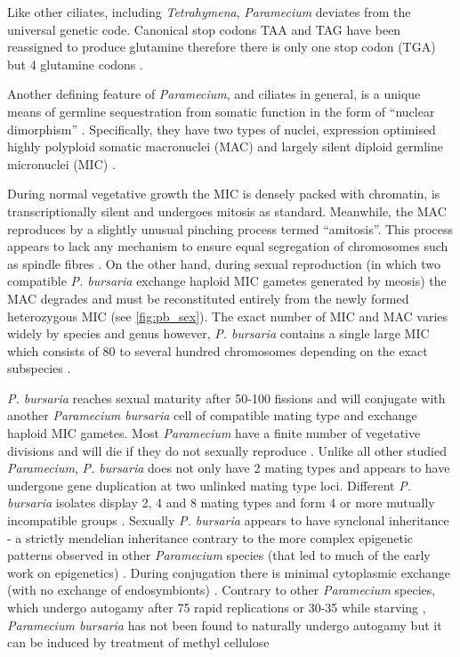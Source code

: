 Like other ciliates, including \textit{Tetrahymena}, \textit{Paramecium} deviates from the universal genetic code.
Canonical stop codons TAA and TAG have been reassigned to produce glutamine therefore there is only one stop codon (TGA) but 4 glutamine codons \citep{Salim2008}.  

Another defining feature of \textit{Paramecium}, and ciliates in general, is a unique means of germline sequestration from somatic function 
in the form of ``nuclear dimorphism'' \citep{Jahn2002}.
Specifically, they have two types of nuclei, expression optimised highly polyploid somatic macronuclei (MAC)
and largely silent diploid germline micronuclei (MIC) \citep{Prescott1994}. 

During normal vegetative growth the MIC is densely packed with chromatin, is transcriptionally silent and undergoes
mitosis as standard.  Meanwhile, the MAC reproduces by a slightly unusual pinching process termed ``amitosis''.  This process
appears to lack any mechanism to ensure equal segregation of chromosomes such as spindle fibres \citep{Kiefer2013}.
On the other hand, during sexual reproduction (in which two compatible \textit{P. bursaria} exchange haploid MIC gametes generated by meosis) the MAC 
degrades and must be reconstituted entirely from the newly formed heterozygous MIC \citep{Jahn2002} (see \ref{fig:pb_sex}).
The exact number of MIC and MAC varies widely by species and genus however, \textit{P. bursaria}
contains a single large MIC which consists of 80 to several hundred chromosomes depending on the exact subspecies \citep{Chen1940}.  

\textit{P. bursaria} reaches sexual maturity after 50-100 fissions \citep{Siegel1960} and will conjugate with another \textit{Paramecium bursaria}
cell of compatible mating type and exchange haploid MIC gametes. Most \textit{Paramecium} have a finite number of vegetative divisions and 
will die if they do not sexually reproduce \citep{Kiefer2013}. Unlike all other studied \textit{Paramecium}, 
\textit{P. bursaria} does not only have 2 mating types and appears to have undergone gene duplication at two unlinked mating type loci.  
Different \textit{P. bursaria} isolates display 2, 4 and 8 mating types \citep{Phadke2009} and form 4 or more mutually 
incompatible groups \citep{Jennings1939}. 
Sexually \textit{P. bursaria} appears to have synclonal inheritance - a strictly mendelian inheritance contrary to the more 
complex epigenetic patterns observed in other \textit{Paramecium} species (that led to much of the early work on epigenetics) \citep{Siegel1960,Phadke2009}.
During conjugation there is minimal cytoplasmic exchange (with no exchange of endosymbionts) \citep{Wichterman1946}. %
Contrary to other \textit{Paramecium} species, which undergo autogamy after 75 rapid replications \citep{Sung2012} or 30-35 while starving
\citep{Berger1986}, \textit{Paramecium bursaria} has not been found to naturally undergo autogamy \citep{Siegel1963,Yanagi2004} 
but it can be induced by treatment of methyl cellulose \citep{Yanagi2004}

